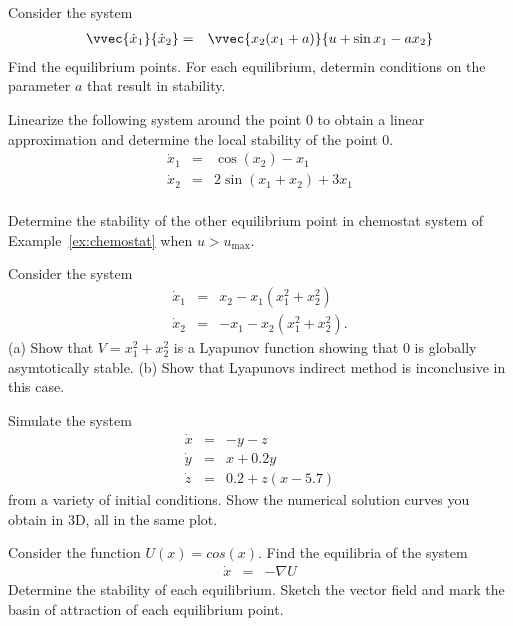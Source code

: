 \begin{exercise}
Consider the system
%
\begin{eqnarray*}
\vvec{\dot x_1}{\dot x_2} & = & \vvec{x_2(x_1+a)}{u+\sin x_1 - a x_2} \\
\end{eqnarray*}
%
Find the equilibrium points. For each equilibrium, determin conditions
on the parameter $a$ that result in stability.
\end{exercise}

\begin{exercise}
  Linearize the following system around the point $0$ to obtain a
  linear approximation and determine the local stability of the point
  $0$.
%
\begin{eqnarray*}
\dot x_1 & = & \cos ( x_2 ) - x_1 \\
\dot x_2 & = & 2 \sin ( x_1 + x_2 ) + 3 x_1 \\
\end{eqnarray*}
\end{exercise}

\begin{exercise}
  Determine the stability of the other equilibrium point in chemostat
  system of Example~\ref{ex:chemostat} when $u > u_\mathrm{max}$. 
\end{exercise}

\begin{exercise}
  Consider the system
%
\begin{eqnarray*}
\dot x_1 & = & x_2 - x_1 ( x_1^2 + x_2^2 ) \\
\dot x_2 & = & -x_1 - x_2 ( x_1^2 + x_2^2 ) .
\end{eqnarray*}
%
(a) Show that $V = x_1^2 + x_2^2$ is a Lyapunov function showing that
$0$ is globally asymtotically stable. (b) Show that Lyapunovs indirect
method is inconclusive in this case. 
%
\end{exercise}

\begin{exercise}
Simulate the system
%
\begin{eqnarray*}
\dot x & = & - y - z \\
\dot y & = & x + 0.2 y \\
\dot z & = & 0.2 + z ( x - 5.7 )
\end{eqnarray*}
from a variety of initial conditions. Show the numerical solution
curves you obtain in 3D, all in the same plot.
%
\end{exercise}

\begin{exercise}
%
Consider the function $U(x) = cos(x)$. Find the equilibria of the system
\begin{eqnarray*}
\dot x & = & -\nabla U
\end{eqnarray*}
Determine the stability of each equilibrium. Sketch the vector field and mark the basin of attraction of each equilibrium point. 
%
\end{exercise}

